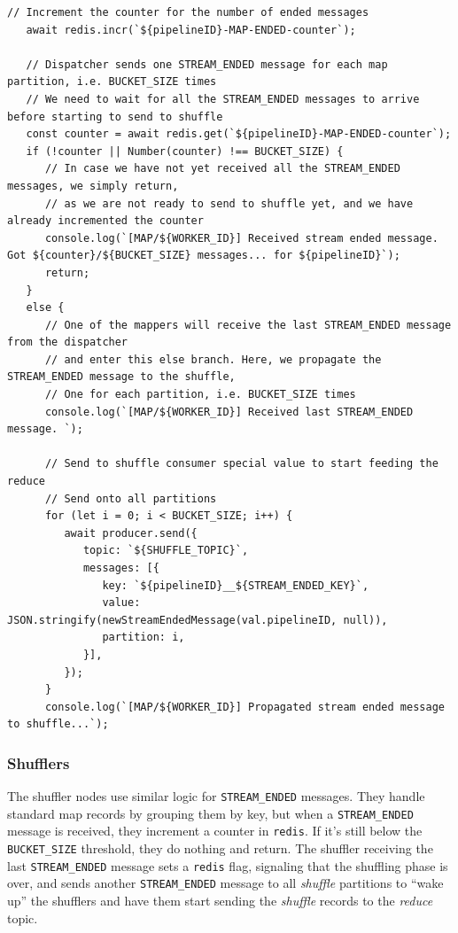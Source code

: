 \begin{lstlisting}[label={lst:streamEndedMapper}, caption={Handling the STREAM\_ENDED message in a mapper},captionpos={top}]
   // Increment the counter for the number of ended messages
   await redis.incr(`${pipelineID}-MAP-ENDED-counter`);
   
   // Dispatcher sends one STREAM_ENDED message for each map partition, i.e. BUCKET_SIZE times
   // We need to wait for all the STREAM_ENDED messages to arrive before starting to send to shuffle
   const counter = await redis.get(`${pipelineID}-MAP-ENDED-counter`);
   if (!counter || Number(counter) !== BUCKET_SIZE) {
      // In case we have not yet received all the STREAM_ENDED messages, we simply return,
      // as we are not ready to send to shuffle yet, and we have already incremented the counter
      console.log(`[MAP/${WORKER_ID}] Received stream ended message. Got ${counter}/${BUCKET_SIZE} messages... for ${pipelineID}`);
      return;
   }
   else {
      // One of the mappers will receive the last STREAM_ENDED message from the dispatcher
      // and enter this else branch. Here, we propagate the STREAM_ENDED message to the shuffle,
      // One for each partition, i.e. BUCKET_SIZE times
      console.log(`[MAP/${WORKER_ID}] Received last STREAM_ENDED message. `);
   
      // Send to shuffle consumer special value to start feeding the reduce
      // Send onto all partitions
      for (let i = 0; i < BUCKET_SIZE; i++) {
         await producer.send({
            topic: `${SHUFFLE_TOPIC}`,
            messages: [{
               key: `${pipelineID}__${STREAM_ENDED_KEY}`,
               value: JSON.stringify(newStreamEndedMessage(val.pipelineID, null)),
               partition: i,
            }],
         });
      }
      console.log(`[MAP/${WORKER_ID}] Propagated stream ended message to shuffle...`);
\end{lstlisting}


\subsubsection{Shufflers}
The shuffler nodes use similar logic for \verb|STREAM_ENDED| messages. 
They handle standard map records by grouping them by key, but when a \verb|STREAM_ENDED| message is received, they increment a counter in \texttt{redis}. If it's still below the \verb|BUCKET_SIZE| threshold, they do nothing and return.
The shuffler receiving the last \verb|STREAM_ENDED| message sets a \texttt{redis} flag, signaling that the shuffling phase is over, and sends another \verb|STREAM_ENDED| message to all \textit{shuffle} partitions to ``wake up'' the shufflers and have them start sending the \textit{shuffle} records to the \textit{reduce} topic.

